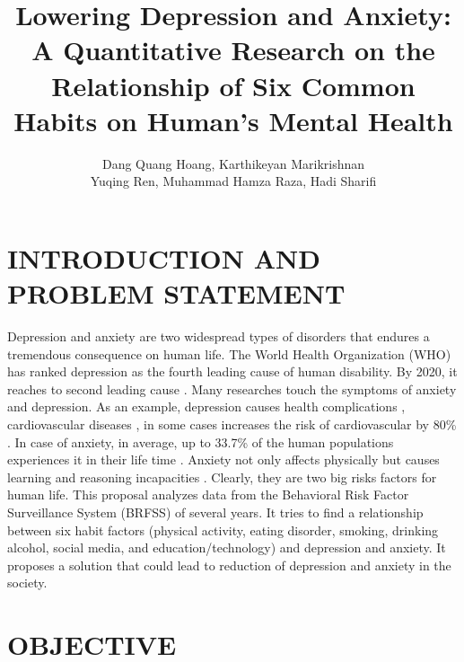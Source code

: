 \documentclass[letterpaper, 10 pt, conference]{ieeeconf}  %
\title{\LARGE \bf
Lowering Depression and Anxiety: A Quantitative Research on the Relationship of Six Common Habits 
on Human's Mental Health
}
\author{Dang Quang Hoang, Karthikeyan Marikrishnan \\ Yuqing Ren, Muhammad Hamza Raza, Hadi Sharifi}
\begin{document}
\maketitle
\thispagestyle{empty}
\pagestyle{empty}






\section{INTRODUCTION AND PROBLEM STATEMENT}
Depression and anxiety are two widespread types of disorders that endures a tremendous consequence on human life.  
The World Health Organization (WHO) has ranked depression as the fourth leading cause of human disability.
By 2020, it reaches to second leading cause \cite{kessler2013epidemiology}. Many researches touch the symptoms of anxiety and depression.
As an example, depression causes health 
complications \cite{verma2017impact}, cardiovascular diseases \cite{bradley2015depression}, in some cases increases 
the risk of cardiovascular by 80\% \cite{penninx2017depression}. In case of anxiety, in average, up to 33.7\% of 
the human populations experiences it in their life time \cite{bandelow2015epidemiology}. Anxiety not only affects physically
but causes learning and reasoning incapacities \cite{spielberger2013effects}\cite{darke1988effects}. 
Clearly, they are two big risks factors for human life.
This proposal analyzes data from the Behavioral Risk Factor Surveillance System (BRFSS) of several years. 
It tries to find a relationship between six habit factors (physical activity, eating disorder, 
smoking, drinking alcohol, social media, and education/technology) and depression and anxiety. It proposes a
solution that could lead to reduction of depression and anxiety in the society. 

\section{OBJECTIVE}
\end{document}
